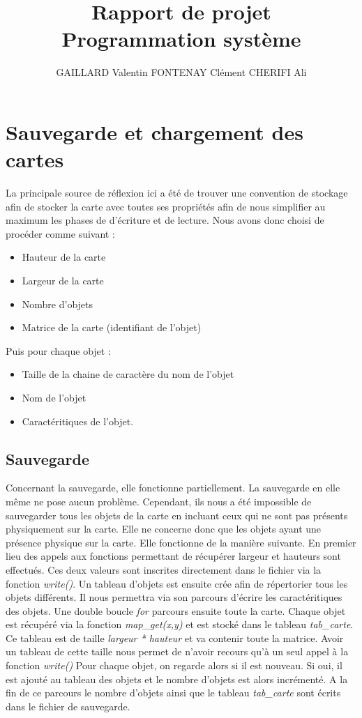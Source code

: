 \documentclass[10pt,a4paper]{article}
\author{GAILLARD Valentin FONTENAY Clément CHERIFI Ali}
\title{Rapport de projet\\Programmation système}
\begin{document}
\maketitle
\newpage
\tableofcontents
\newpage

\section{Sauvegarde et chargement des cartes}
La principale source de réflexion ici a été de trouver une convention de stockage afin de stocker la carte avec toutes ses propriétés afin de nous simplifier au maximum les phases de d'écriture et de lecture.
Nous avons donc choisi de procéder comme suivant : 
\begin{itemize}
\item Hauteur de la carte
\item Largeur de la carte
\item Nombre d'objets
\item Matrice de la carte (identifiant de l'objet)
\end{itemize}
Puis pour chaque objet : 
\begin{itemize}
\item Taille de la chaine de caractère du nom de l'objet 
\item Nom de l'objet 
\item Caractéritiques de l'objet.
\end{itemize}
\subsection{Sauvegarde}

	Concernant la sauvegarde, elle fonctionne partiellement. La sauvegarde en elle même ne pose aucun problème. Cependant, ils nous a été impossible de sauvegarder tous les objets de la carte en incluant ceux qui ne sont pas présents physiquement sur la carte. Elle ne concerne donc que les objets ayant une présence physique sur la carte.
	Elle fonctionne de la manière suivante. En premier lieu des appels aux fonctions permettant de récupérer largeur et hauteurs sont effectués. Ces deux valeurs sont inscrites directement dans le fichier via la fonction \textit{write()}. Un tableau d'objets est ensuite crée afin de répertorier tous les objets différents. Il nous permettra via son parcours d'écrire les caractéritiques des objets. Une double boucle \textit{for} parcours ensuite toute la carte. Chaque objet est récupéré via la fonction \textit{map\_get(x,y)} et est stocké dans le tableau \textit{tab\_carte}. Ce tableau est de taille \textit{largeur * hauteur} et va contenir toute la matrice. Avoir un tableau de cette taille nous permet de n'avoir recours qu'à un seul appel à la fonction \textit{write()} Pour chaque objet, on regarde alors si il est nouveau. Si oui, il est ajouté au tableau des objets et le nombre d'objets est alors incrémenté.
	A la fin de ce parcours le nombre d'objets ainsi que le tableau \textit{tab\_carte} sont écrits dans le fichier de sauvegarde.
	
\end{document}
